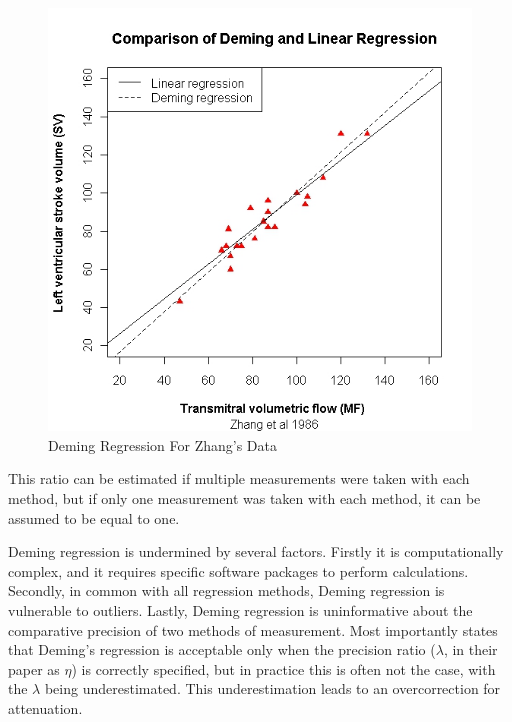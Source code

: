 \documentclass[12pt, a4paper]{report}
\theoremstyle{plain}
\theoremstyle{definition}
\theoremstyle{remark}
\begin{document}
\begin{figure}[h!]
	\includegraphics[width=130mm]{images/ZhangDeming.jpeg}
	\caption{Deming Regression For Zhang's Data}\label{ZhangDeming}
\end{figure}







	
This ratio can be estimated if multiple measurements were taken with each method, but if only one measurement was taken with each method, it can be assumed to be equal to one.
	

	

	
Deming regression is undermined by several factors. Firstly it is computationally complex, and it requires specific software packages to perform calculations. Secondly, in common with all regression methods, Deming regression is vulnerable to outliers. Lastly, Deming regression is uninformative about the comparative precision of two methods of measurement. Most importantly \citet{CarollRupert} states that Deming's regression is acceptable only when the precision ratio ($\lambda$, in their paper as $\eta$) is correctly specified, but in practice this is often not the case, with the $\lambda$ being underestimated. This underestimation leads to an overcorrection for attenuation.
\end{document}
